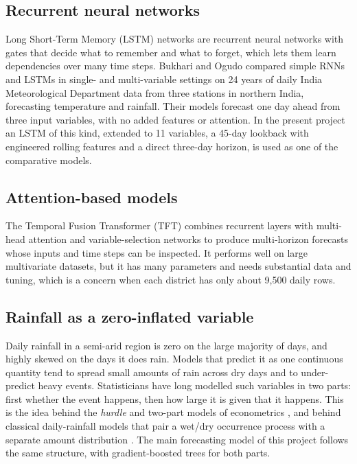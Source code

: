 \subsection{Recurrent neural networks}
Long Short-Term Memory (LSTM) networks \cite{hochreiter1997long} are recurrent neural networks with gates that decide what to remember and what to forget, which lets them learn dependencies over many time steps. Bukhari and Ogudo \cite{bukhari2025forecasting} compared simple RNNs and LSTMs in single- and multi-variable settings on 24 years of daily India Meteorological Department data from three stations in northern India, forecasting temperature and rainfall. Their models forecast one day ahead from three input variables, with no added features or attention. In the present project an LSTM of this kind, extended to 11 variables, a 45-day lookback with engineered rolling features and a direct three-day horizon, is used as one of the comparative models.

\subsection{Attention-based models}
The Temporal Fusion Transformer (TFT) \cite{lim2021temporal} combines recurrent layers with multi-head attention and variable-selection networks to produce multi-horizon forecasts whose inputs and time steps can be inspected. It performs well on large multivariate datasets, but it has many parameters and needs substantial data and tuning, which is a concern when each district has only about 9,500 daily rows.

\subsection{Rainfall as a zero-inflated variable}
Daily rainfall in a semi-arid region is zero on the large majority of days, and highly skewed on the days it does rain. Models that predict it as one continuous quantity tend to spread small amounts of rain across dry days and to under-predict heavy events. Statisticians have long modelled such variables in two parts: first whether the event happens, then how large it is given that it happens. This is the idea behind the \emph{hurdle} and two-part models of econometrics \cite{cragg1971some,mullahy1986specification}, and behind classical daily-rainfall models that pair a wet/dry occurrence process with a separate amount distribution \cite{stern1984model}. The main forecasting model of this project follows the same structure, with gradient-boosted trees for both parts.

